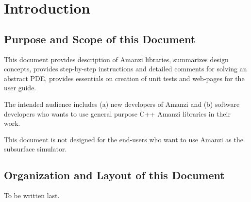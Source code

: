 %
%

\section{Introduction}

\subsection{Purpose and Scope of this Document}

This document provides description of Amanzi libraries, summarizes design concepts,
provides step-by-step instructions and detailed comments for solving an abstract PDE,
provides essentials on creation of unit tests and web-pages for the user guide.

The intended audience includes (a) new developers of Amanzi and (b) software developers
who wants to use general purpose C++ Amanzi libraries in their work. 

This document is not designed for the end-users who want to use Amanzi as the 
subsurface simulator.


\subsection{Organization and Layout of this Document}

To be written last.






